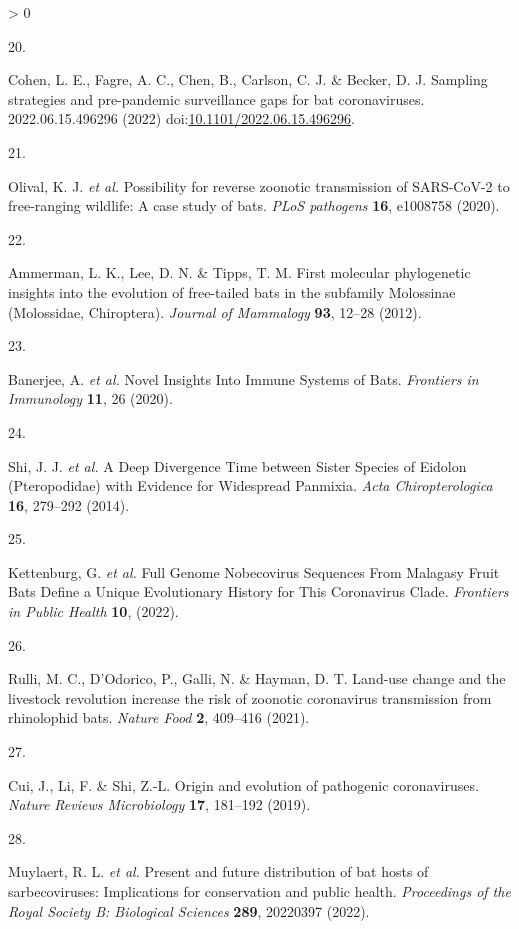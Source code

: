 \documentclass[11pt]{article}
\newlength{\cslhangindent}
\newlength{\csllabelwidth}
\newenvironment{CSLReferences}[3] %
 {%
  \setlength{\parindent}{0pt}
  \ifodd #1 \everypar{\setlength{\hangindent}{\cslhangindent}}\ignorespaces\fi
  \ifnum #2 > 0
  \setlength{\parskip}{#2\baselineskip}
  \fi
 }%
 {}
\newcommand{\CSLLeftMargin}[1]{\parbox[t]{\maxof{\widthof{#1}}{\csllabelwidth}}{#1}}
\newcommand{\CSLRightInline}[1]{\parbox[t]{\linewidth}{#1}}
\begin{document}
\begin{CSLReferences}{0}{0}
\leavevmode\hypertarget{ref-Cohen2022SamStr}{}%
\CSLLeftMargin{20. }
\CSLRightInline{Cohen, L. E., Fagre, A. C., Chen, B., Carlson, C. J. \&
Becker, D. J. Sampling strategies and pre-pandemic surveillance gaps for
bat coronaviruses. 2022.06.15.496296 (2022)
doi:\href{https://doi.org/10.1101/2022.06.15.496296}{10.1101/2022.06.15.496296}.}

\leavevmode\hypertarget{ref-Olival2020PosRev}{}%
\CSLLeftMargin{21. }
\CSLRightInline{Olival, K. J. \emph{et al.} Possibility for reverse
zoonotic transmission of SARS-CoV-2 to free-ranging wildlife: A case
study of bats. \emph{PLoS pathogens} \textbf{16}, e1008758 (2020).}

\leavevmode\hypertarget{ref-Ammerman2012FirMol}{}%
\CSLLeftMargin{22. }
\CSLRightInline{Ammerman, L. K., Lee, D. N. \& Tipps, T. M. First
molecular phylogenetic insights into the evolution of free-tailed bats
in the subfamily Molossinae (Molossidae, Chiroptera). \emph{Journal of
Mammalogy} \textbf{93}, 12--28 (2012).}

\leavevmode\hypertarget{ref-Banerjee2020NovIns}{}%
\CSLLeftMargin{23. }
\CSLRightInline{Banerjee, A. \emph{et al.} Novel Insights Into Immune
Systems of Bats. \emph{Frontiers in Immunology} \textbf{11}, 26 (2020).}

\leavevmode\hypertarget{ref-Shi2014DeeDiv}{}%
\CSLLeftMargin{24. }
\CSLRightInline{Shi, J. J. \emph{et al.} A Deep Divergence Time between
Sister Species of Eidolon (Pteropodidae) with Evidence for Widespread
Panmixia. \emph{Acta Chiropterologica} \textbf{16}, 279--292 (2014).}

\leavevmode\hypertarget{ref-Kettenburg2022FulGen}{}%
\CSLLeftMargin{25. }
\CSLRightInline{Kettenburg, G. \emph{et al.} Full Genome Nobecovirus
Sequences From Malagasy Fruit Bats Define a Unique Evolutionary History
for This Coronavirus Clade. \emph{Frontiers in Public Health}
\textbf{10}, (2022).}

\leavevmode\hypertarget{ref-Rulli2021LanCha}{}%
\CSLLeftMargin{26. }
\CSLRightInline{Rulli, M. C., D'Odorico, P., Galli, N. \& Hayman, D. T.
Land-use change and the livestock revolution increase the risk of
zoonotic coronavirus transmission from rhinolophid bats. \emph{Nature
Food} \textbf{2}, 409--416 (2021).}

\leavevmode\hypertarget{ref-Cui2019OriEvo}{}%
\CSLLeftMargin{27. }
\CSLRightInline{Cui, J., Li, F. \& Shi, Z.-L. Origin and evolution of
pathogenic coronaviruses. \emph{Nature Reviews Microbiology}
\textbf{17}, 181--192 (2019).}

\leavevmode\hypertarget{ref-Muylaert2022PreFut}{}%
\CSLLeftMargin{28. }
\CSLRightInline{Muylaert, R. L. \emph{et al.} Present and future
distribution of bat hosts of sarbecoviruses: Implications for
conservation and public health. \emph{Proceedings of the Royal Society
B: Biological Sciences} \textbf{289}, 20220397 (2022).}


\end{CSLReferences}
\end{document}
